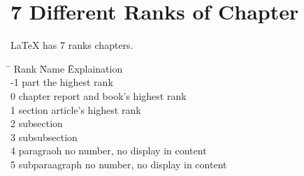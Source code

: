 
\chapter[Chapter]{7 Different Ranks of Chapter}
    LaTeX has 7 ranks chapters. 
    \begin{tabbing}
        \qquad \=\+ Rank \qquad \= Name \qquad \= Explaination \\
        \vspace{5cm}
                    -1 \>          part \>        the highest rank \\
                    0 \>           chapter \>     report and book's highest rank \\
                    1 \>           section \>     article's highest rank \\
                    2 \>           subsection \\
                    3 \>           subsubsection \\
                    4 \>           paragraoh \>   no number, no display in content \\
                    5 \>           subparaagraph \> no number, no display in content
    \end{tabbing}

